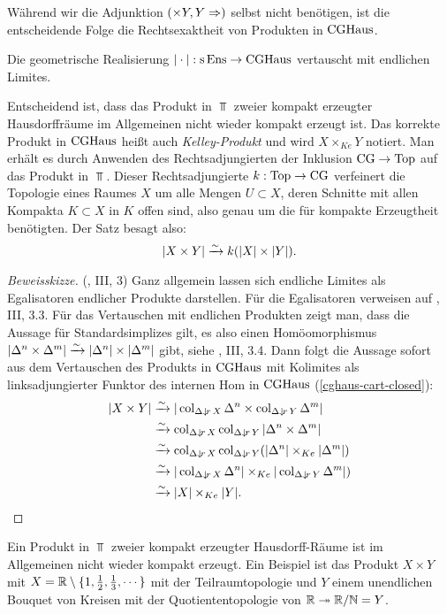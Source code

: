 Während wir die Adjunktion $(\times Y, Y \Rightarrow)$ selbst nicht
benötigen, ist die entscheidende Folge die Rechtsexaktheit von
Produkten in $\operatorname{CGHaus}$.
\begin{satz} \label{real-products}
  Die geometrische Realisierung $|\cdot|: \operatorname{s}\operatorname{Ens} \to \operatorname{CGHaus}$
  vertauscht mit endlichen Limites.
\end{satz}
\begin{bem}
   Entscheidend ist, dass das Produkt in $\Top$ zweier kompakt
   erzeugter Hausdorffräume im Allgemeinen nicht wieder kompakt
   erzeugt ist. Das korrekte Produkt in $\operatorname{CGHaus}$ heißt auch
   \emph{Kelley-Produkt} und wird $X \times_{Ke} Y$ notiert. Man
   erhält es durch Anwenden des Rechtsadjungierten der Inklusion $\operatorname{CG}
   \to \operatorname{Top}$ auf das Produkt in $\Top$. Dieser Rechtsadjungierte $k:
   \operatorname{Top} \to \operatorname{CG}$ verfeinert die Topologie eines Raumes $X$ um alle
   Mengen $U \subset X$, deren Schnitte mit allen Kompakta $K \subset
   X$ in $K$ offen sind, also genau um die für kompakte Erzeugtheit
   benötigten. Der Satz besagt also:
   \[ |X \times Y| \xrightarrow[]{\sim} k(|X| \times |Y|). \]
\end{bem}
\begin{proof}[Beweisskizze](\cite{Gabriel-Zisman}, III, 3)
   Ganz allgemein lassen sich endliche Limites als Egalisatoren
   endlicher Produkte darstellen. Für die Egalisatoren verweisen auf
   \cite{Gabriel-Zisman}, III, 3.3. Für das Vertauschen mit endlichen
   Produkten zeigt man, dass die Aussage für Standardsimplizes gilt,
   es also einen Homöomorphismus $|\Delta^n \times \Delta^m| \xrightarrow[]{\sim}
   |\Delta^n| \times |\Delta^m|$ gibt, siehe \cite{Gabriel-Zisman},
   III, 3.4. Dann folgt die Aussage sofort aus dem Vertauschen des
   Produkts in $\operatorname{CGHaus}$ mit Kolimites als linksadjungierter Funktor
   des internen Hom in $\operatorname{CGHaus}$ (\ref{cghaus-cart-closed}):
   \begin{align*}
     |X \times Y|
     &\iso |\col_{\slicecat{\Delta}{r}{X}} \Delta^n \times
     \col_{\slicecat{\Delta}{r}{Y}} \Delta^m| \\
     &\iso \col_{\slicecat{\Delta}{r}{X}} \col_{\slicecat{\Delta}{r}{Y}}
     |\Delta^n \times \Delta^m| \\
     &\iso \col_{\slicecat{\Delta}{r}{X}} \col_{\slicecat{\Delta}{r}{Y}}
     (|\Delta^n| \times_{Ke} |\Delta^m|) \\
     &\iso |\col_{\slicecat{\Delta}{r}{X}} \Delta^n|
     \times_{Ke} |\col_{\slicecat{\Delta}{r}{Y}} \Delta^m|) \\
     &\iso |X| \times_{Ke} |Y|.
   \end{align*}
\end{proof}
\begin{bsp} \label{ex:cg-products}
  Ein Produkt in $\Top$ zweier kompakt erzeugter Hausdorff-Räume ist
  im Allgemeinen nicht wieder kompakt erzeugt. Ein Beispiel ist das
  Produkt $X \times Y$ mit $X = \mathbb{R} \setminus \{1, \frac{1}{2},
  \frac{1}{3}, \cdots \}$ mit der Teilraumtopologie und $Y$ einem
  unendlichen Bouquet von Kreisen mit der Quotiententopologie von $\mathbb{R}
  \twoheadrightarrow \mathbb{R}/\mathbb{N} = Y$.
\end{bsp}

